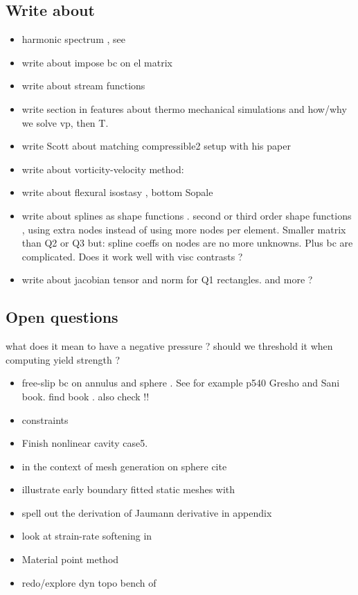 \subsection{Write about}

\begin{itemize}
\item harmonic spectrum , see \cite{ribr99}
\item write about impose bc on el matrix
\item write about stream functions 
\item write section in features about thermo mechanical simulations and how/why we solve vp, then T.
\item write Scott about matching compressible2 setup with his paper
\item write about vorticity-velocity method: \cite{gats91,gust93,dehu95,ergq99,amct04,spez87}
\item write about flexural isostasy \cite{maie12}, bottom Sopale
\item write about splines as shape functions \cite{chri92}. second or third order shape functions , using extra nodes instead of using more nodes per element. Smaller matrix than Q2 or Q3 but: spline coeffs on nodes are no more unknowns. Plus bc are complicated. Does it work well with visc contrasts ?
\item write about jacobian tensor and norm for Q1 rectangles. and more ?
\end{itemize}



\subsection{Open questions}

what does it mean to have a negative pressure ? should we threshold it when computing yield strength ? 



\begin{itemize} 
\item free-slip bc on annulus and sphere . See for example p540 Gresho and Sani book. find book \cite{deab72}.
also check \cite{ensg82} !!
\item constraints \cite{absh79}
\item Finish nonlinear cavity case5.
\item in the context of mesh generation on sphere cite \cite{moma19}
\item illustrate early boundary fitted static meshes with \cite{thar85}
\item \cite{bepo10} spell out the derivation of Jaumann derivative in appendix
\item look at strain-rate softening in \cite{belz02}
\item Material point method \cite{sucs94,susc96,susp07}
\item redo/explore dyn topo bench of \cite{bore19}
\end{itemize}

